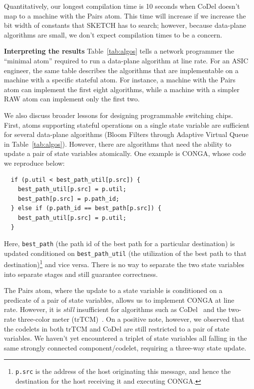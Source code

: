 Quantitatively, our longest compilation time is
10 seconds when CoDel doesn't map to a \absmachine machine with the Pairs atom.
This time will increase if we increase the bit width of constants that SKETCH
has to search; however, because data-plane algorithms are small,
we don't expect compilation times to be a concern.

\textbf{Interpreting the results}
Table~\ref{tab:algos} tells a network programmer the ``minimal atom'' required
to run a data-plane algorithm at line rate. For an ASIC engineer, the same
table describes the algorithms that are implementable on a \absmachine machine
with a specific stateful atom. For instance, a \absmachine machine with the
Pairs atom can implement the first eight algorithms, while a machine with a
simpler RAW atom can implement only the first two.

We also discuss broader lessons for designing programmable switching chips.
First, atoms supporting stateful operations on a single state variable are
sufficient for several data-plane algorithms (Bloom Filters through Adaptive
Virtual Queue in Table~\ref{tab:algos}). However, there are algorithms that
need the ability to update a pair of state variables atomically. One example is
CONGA, whose code we reproduce below:
\begin{verbatim}
  if (p.util < best_path_util[p.src]) {
    best_path_util[p.src] = p.util;
    best_path[p.src] = p.path_id;
  } else if (p.path_id == best_path[p.src]) {
    best_path_util[p.src] = p.util;
  }
\end{verbatim}
Here, \texttt{best\_path} (the path id of the best path for a particular
destination) is updated conditioned on \texttt{best\_path\_util} (the
utilization of the best path to that destination)\footnote{{\tt p.src} is the address
  of the host originating this message, and hence the destination for the host
receiving it and executing CONGA.} and vice versa. There is no way to separate
the two state variables into separate stages and still guarantee correctness.

The Pairs atom, where the update to a state variable is conditioned on a
predicate of a pair of state variables, allows us to implement CONGA at line
rate.  However, it is \textit{still} insufficient for algorithms such as
CoDel~\cite{codel} and the two-rate three-color meter (trTCM)~\cite{trTCM}.  On
a positive note, however, we observed that the codelets in both trTCM and CoDel
are still restricted to a pair of state variables.  We haven't yet encountered
a triplet of state variables all falling in the same strongly connected
component/codelet, requiring a three-way state update.

